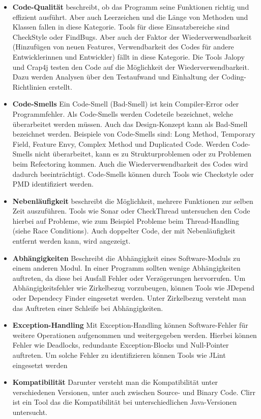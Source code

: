 \begin{itemize}
\item \textbf{Code-Qualität} beschreibt, ob das Programm seine Funktionen richtig und effizient ausführt. Aber auch Leerzeichen und die Länge von Methoden und Klassen fallen in diese Kategorie. Tools für diese Einsatzbereiche sind CheckStyle oder FindBugs. Aber auch der Faktor der Wiederverwendbarkeit (Hinzufügen von neuen Features, Verwendbarkeit des Codes für andere Entwicklerinnen und Entwickler) fällt in diese Kategorie. Die Tools Jalopy und Crap4j testen den Code auf die Möglichkeit der Wiederverwendbarkeit. Dazu werden Analysen über den Testaufwand und Einhaltung der Coding-Richtlinien erstellt.
\item  \textbf{Code-Smells}
Ein Code-Smell (Bad-Smell) ist kein Compiler-Error oder Programmfehler. Als Code-Smells werden Codeteile bezeichnet, welche überarbeitet werden müssen. Auch das Design-Konzept kann als Bad-Smell bezeichnet werden. Beispiele von Code-Smells sind: Long Method, Temporary Field, Feature Envy, Complex Method und Duplicated Code. Werden Code-Smells nicht überarbeitet, kann es zu Strukturproblemen oder zu Problemen beim Refectoring kommen. Auch die Wiederverwendbarkeit des Codes wird dadurch beeinträchtigt. Code-Smells können durch Tools wie Checkstyle oder PMD identifiziert werden. \cite{palomba2014they}
\item \textbf{Nebenläufigkeit}
beschreibt die Möglichkeit, mehrere Funktionen zur selben Zeit auszuführen. Tools wie Sonar oder CheckThread untersuchen den Code hierbei auf Probleme, wie zum Beispiel Probleme beim Thread-Handling (siehe Race Conditions). Auch doppelter Code, der mit Nebenläufigkeit entfernt werden kann, wird angezeigt.
\item \textbf{Abhängigkeiten}
Beschreibt die Abhängigkeit eines Software-Moduls zu einem anderen Modul. In einer Programm sollten wenige Abhängigkeiten auftreten, da diese bei Ausfall Fehler oder Verzögerungen hervorrufen. Um Abhängigkeitsfehler wie Zirkelbezug vorzubeugen, können Tools wie JDepend oder Dependecy Finder eingesetzt werden. Unter Zirkelbezug versteht man das Auftreten einer Schleife bei Abhängigkeiten.
\item \textbf{Exception-Handling} Mit Exception-Handling können Software-Fehler für weitere Operationen aufgenommen und weitergegeben werden. Hierbei können Fehler wie Deadlocks, redundante Exception-Blocks und Null-Pointer auftreten. Um solche Fehler zu identifizieren können Tools wie JLint eingesetzt werden
\item \textbf{Kompatibilität} Darunter versteht man die Kompatibilität unter verschiedenen Versionen, unter auch zwischen Source- und Binary Code.  Clirr ist ein Tool das die Kompatibilität bei unterschiedlichen Java-Versionen untersucht. 

\end{itemize}
